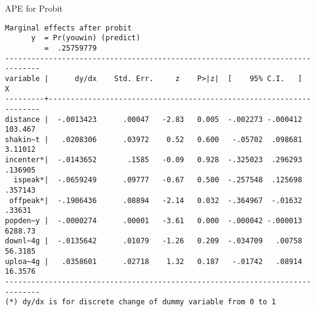 \begin{frame}[fragile]{APE for Probit}


\lstset{basicstyle=\tiny,style=myCustomMatlabStyle}
\begin{lstlisting}
Marginal effects after probit
      y  = Pr(youwin) (predict)
         =  .25759779
------------------------------------------------------------------------------
variable |      dy/dx    Std. Err.     z    P>|z|  [    95% C.I.   ]      X
---------+--------------------------------------------------------------------
distance |  -.0013423      .00047   -2.83   0.005  -.002273 -.000412   103.467
shakin~t |   .0208306      .03972    0.52   0.600   -.05702  .098681   3.11012
incenter*|  -.0143652       .1585   -0.09   0.928  -.325023  .296293   .136905
  ispeak*|  -.0659249      .09777   -0.67   0.500  -.257548  .125698   .357143
 offpeak*|  -.1906436      .08894   -2.14   0.032  -.364967  -.01632    .33631
popden~y |  -.0000274      .00001   -3.61   0.000  -.000042 -.000013   6288.73
downl~4g |  -.0135642      .01079   -1.26   0.209  -.034709   .00758   56.3185
uploa~4g |   .0358601      .02718    1.32   0.187   -.01742   .08914   16.3576
------------------------------------------------------------------------------
(*) dy/dx is for discrete change of dummy variable from 0 to 1

\end{lstlisting}
\end{frame}

